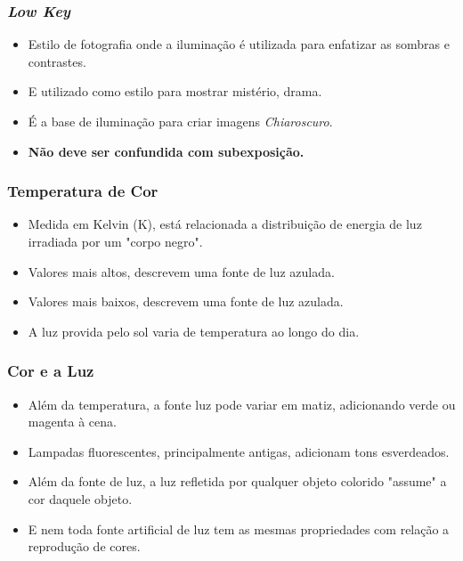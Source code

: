 
\begin{frame}
    \frametitle{\textit{Low Key}}
    \begin{itemize}
      \item Estilo de fotografia onde a iluminação é utilizada para enfatizar as
      sombras e contrastes.
      \item E utilizado como estilo para mostrar mistério, drama.
      \item É a base de iluminação para criar imagens \textit{Chiaroscuro}.
      \item \textbf{Não deve ser confundida com subexposição.}
    \end{itemize}
\end{frame}



\begin{frame}
    \frametitle{Temperatura de Cor}
    \begin{itemize}
      \item Medida em Kelvin (K), está relacionada a distribuição de energia de luz
      irradiada por um "corpo negro".
      \item Valores mais altos, descrevem uma fonte de luz azulada.
      \item Valores mais baixos, descrevem uma fonte de luz azulada.
      \item A luz provida pelo sol varia de temperatura ao longo do dia.
    \end{itemize}
\end{frame}


\begin{frame}
    \frametitle{Cor e a Luz}
    \begin{itemize}
      \item Além da temperatura, a fonte luz pode variar em matiz, adicionando verde ou magenta
      à cena.
      \item Lampadas fluorescentes, principalmente antigas, adicionam tons esverdeados.
      \item Além da fonte de luz, a luz refletida por qualquer objeto colorido "assume" a cor
      daquele objeto.
      \item E nem toda fonte artificial de luz tem as mesmas propriedades com relação a
      reprodução de cores.
    \end{itemize}
\end{frame}

